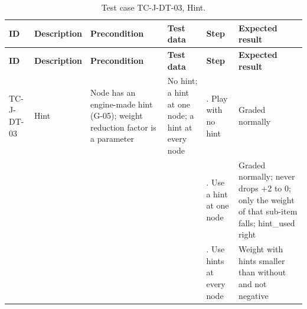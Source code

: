 {\footnotesize{}\renewcommand{\arraystretch}{1.1}
\begin{longtable}{|>{\raggedright\arraybackslash}p{}|>{\raggedright\arraybackslash}p{}|>{\raggedright\arraybackslash}p{}|>{\raggedright\arraybackslash}p{}|>{\raggedright\arraybackslash}p{}|>{\raggedright\arraybackslash}p{}|}
\caption{Test case TC-J-DT-03, Hint.} \\
\hline
\textbf{ID} & \textbf{Description} & \textbf{Precondition} & \textbf{Test data} & \textbf{Step} & \textbf{Expected result} \\ \hline
\endfirsthead
\hline
\textbf{ID} & \textbf{Description} & \textbf{Precondition} & \textbf{Test data} & \textbf{Step} & \textbf{Expected result} \\ \hline
\endhead
TC-J-DT-03 & Hint & Node has an engine-made hint (G-05); weight reduction factor is a parameter & No hint; a hint at one node; a hint at every node & 1. Play with no hint & Graded normally \\ \cline{5-6}
 &  &  &  & 2. Use a hint at one node & Graded normally; never drops +2 to 0; only the weight of that sub-item falls; hint\_used right \\ \cline{5-6}
 &  &  &  & 3. Use hints at every node & Weight with hints smaller than without and not negative \\ \hline
\end{longtable}
}

